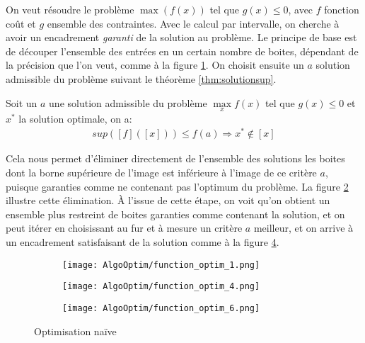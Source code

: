On veut résoudre le problème $\max(f(x))$ tel que $g(x) \leq 0$, avec $f$ fonction coût et $g$ ensemble des contraintes. Avec le calcul par intervalle, on cherche à avoir un encadrement \textit{garanti} de la solution au problème. Le principe de base est de découper l'ensemble des entrées en un certain nombre de boites, dépendant de la précision que l'on veut, comme à la figure \ref{fig:optim1}. On choisit ensuite un $a$ solution admissible du problème suivant le théorème \ref{thm:solutionsup}.

\begin{theoreme}
  \label{thm:solutionsup}
  Soit un $a$ une solution admissible du problème $\max\limits_{x} f(x)$ tel que $g(x) \leq 0$ et $x^*$ la solution optimale, on a:
  \begin{align}
      sup([f]([x])) \leq f(a) \Rightarrow x^* \notin [x]
  \end{align}
\end{theoreme}

Cela nous permet d'éliminer directement de l'ensemble des solutions les boites dont la borne supérieure de l'image est inférieure à l'image de ce critère $a$, puisque garanties comme ne contenant pas l'optimum du problème. La figure \ref{fig:optim2} illustre cette élimination. \`A l'issue de cette étape, on voit qu'on obtient un ensemble plus restreint de boites garanties comme contenant la solution, et on peut itérer en choisissant au fur et à mesure un critère $a$ meilleur, et on arrive à un encadrement satisfaisant de la solution comme à la figure \ref{fig:optim3}.

\begin{figure}[H]
  \centering
  \begin{subfigure}[h]{0.3\textwidth}
      \centering
      \texttt{[image: AlgoOptim/function\_optim\_1.png]}
      \caption{}
      \label{fig:optim1}
  \end{subfigure}
  \begin{subfigure}[h]{0.3\textwidth}
      \centering
      \texttt{[image: AlgoOptim/function\_optim\_4.png]}
      \caption{}
      \label{fig:optim2}
  \end{subfigure}
  \begin{subfigure}[h]{0.3\textwidth}
      \centering
      \texttt{[image: AlgoOptim/function\_optim\_6.png]}
      \caption{}
      \label{fig:optim3}
  \end{subfigure}
  \caption{Optimisation naïve}
\end{figure}

